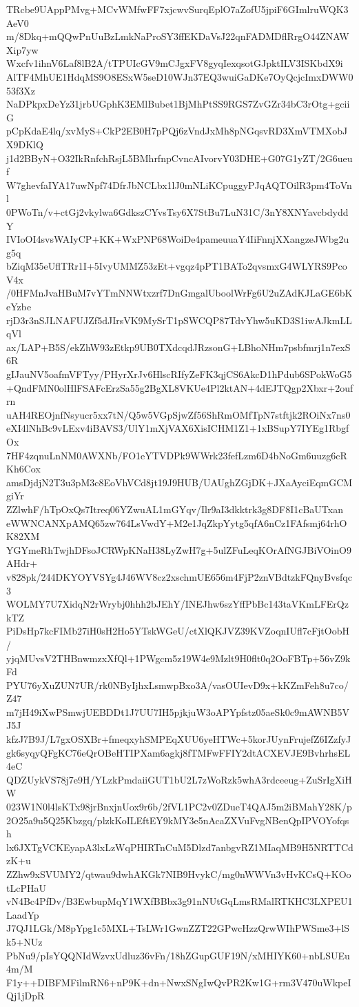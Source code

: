 TRcbe9UAppPMvg+MCvWMfwFF7xjcwvSurqEplO7aZofU5jpiF6GImlruWQK3AeV0
m/8Dkq+mQQwPnUuBzLmkNaProSY3ffEKDaVsJ22qnFADMDflRrgO44ZNAWXip7yw
Wxcfv1ihnV6Laf8lB2A/tTPUIcGV9mCJgxFV8gyqIexqsotGJpktILV3ISKbdX9i
AlTF4MhUE1HdqMS9O8ESxW5seD10WJn37EQ3wuiGaDKe7OyQcjcImxDWW053f3Xz
NaDPkpxDeYz31jrbUGphK3EMlBubet1BjMhPtSS9RGS7ZvGZr34bC3rOtg+gciiG
pCpKdaE4lq/xvMyS+CkP2EB0H7pPQj6zVndJxMh8pNGqsvRD3XmVTMXobJX9DKlQ
j1d2BByN+O32IkRnfchRsjL5BMhrfnpCvncAIvorvY03DHE+G07G1yZT/2G6ueuf
W7ghevfaIYA17uwNpf74DfrJbNCLbx1lJ0mNLiKCpuggyPJqAQTOilR3pm4ToVnl
0PWoTn/v+ctGj2vkylwa6GdkszCYvsTsy6X7StBu7LuN31C/3nY8XNYavcbdyddY
IVIoOI4svsWAIyCP+KK+WxPNP68WoiDe4pameuuaY4IiFnnjXXangzeJWbg2ug5q
bZiqM35eUflTRr1I+5IvyUMMZ53zEt+vgqz4pPT1BATo2qvsmxG4WLYRS9PcoV4x
/0HFMnJvaHBuM7vYTmNNWtxzrf7DnGmgalUboolWrFg6U2uZAdKJLaGE6bKeYzbe
rjD3r3nSJLNAFUJZf5dJIrsVK9MySrT1pSWCQP87TdvYhw5uKD3S1iwAJkmLLqVl
ax/LAP+B5S/ekZhW93zEtkp9UB0TXdcqdJRzsonG+LBhoNHm7psbfmrj1n7exS6R
gIJauNV5oafmVFTyy/PHyrXrJv6HlscRIfyZeFK3qjCS6AkcD1hPdub6SPokWoG5
+QndFMN0olHlFSAFcErzSa55g2BgXL8VKUe4Pl2ktAN+4dEJTQgp2Xbxr+2oufrn
uAH4REOjnfNsyucr5xx7tN/Q5w5VGpSjwZf56ShRmOMfTpN7stftjk2ROiNx7ns0
eXI4lNhBc9vLExv4iBAVS3/UlY1mXjVAX6XisICHM1Z1+1xBSupY7IYEg1RbgfOx
7HF4zqnuLnNM0AWXNb/FO1eYTVDPk9WWrk23fefLzm6D4bNoGm6uuzg6cRKh6Cox
amsDjdjN2T3u3pM3c8EoVhVCd8jt19J9HUB/UAUghZGjDK+JXaAyciEqmGCMgiYr
ZZlwhF/hTpOxQs7Itreq06YZwuAL1mGYqv/Ilr9aI3dkktrk3g8DF8I1cBaUTxan
eWWNCANXpAMQ65zw764LsVwdY+M2e1JqZkpYytg5qfA6nCz1FAfsmj64rhOK82XM
YGYmeRhTwjhDFsoJCRWpKNaH38LyZwH7g+5ulZFuLeqKOrAfNGJBiVOinO9AHdr+
v828pk/244DKYOYVSYg4J46WV8cz2xschmUE656m4FjP2znVBdtzkFQnyBvsfqc3
WOLMY7U7XidqN2rWrybj0hhh2bJEhY/INEJhw6szYffPbBc143taVKmLFErQzkTZ
PiDsHp7kcFIMb27iH0sH2Ho5YTskWGeU/ctXlQKJVZ39KVZoqnIUfl7cFjtOobH/
yjqMUvsV2THBnwmzxXfQl+1PWgcm5z19W4e9Mzlt9H0flt0q2OoFBTp+56vZ9kFd
PYU76yXuZUN7UR/rk0NByIjhxLsmwpBxo3A/vasOUIevD9x+kKZmFeh8u7co/Z47
m7jH49iXwPSmwjUEBDDt1J7UU7IH5pjkjuW3oAPYpfstz05aeSk0c9mAWNB5VJ5J
kfzJ7B9J/L7gxOSXBr+fmeqxyhSMPEqXUU6yeHTWc+5korJUynFrujefZ6IZzfyJ
gk6syqyQFgKC76eQrOBeHTIPXam6agkj8fTMFwFFIY2dtACXEVJE9BvhrhsEL4eC
QDZUykVS78j7e9H/YLzkPmdaiiGUT1bU2L7zWoRzk5whA3rdceeug+ZuSrIgXiHW
023W1N0l4lsKTx98jrBnxjnUox9r6b/2fVL1PC2v0ZDueT4QAJ5m2iBMahY28K/p
2O25a9u5Q25Kbzgq/plzkKoILEftEY9kMY3e5nAcaZXVuFvgNBenQpIPVOYofqsh
lx6JXTgVCKEyapA3lxLzWqPHIRTnCuM5Dlzd7anbgvRZ1MIaqMB9H5NRTTCdzK+u
ZZhw9xSVUMY2/qtwau9dwhAKGk7NIB9HvykC/mg0nWWVn3vHvKCsQ+KOotLcPHaU
vN4Bc4PfDv/B3EwbupMqY1WXfBBbx3g91nNUtGqLmsRMalRTKHC3LXPEU1LaadYp
J7QJ1LGk/M8pYpg1c5MXL+TsLWr1GwnZZT22GPwcHzzQrwWIhPWSme3+lSk5+NUz
PbNu9/pIsYQQNIdWzvxUdluz36vFn/18hZGupGUF19N/xMHIYK60+nbLSUEu4m/M
F1y++DIBFMFilmRN6+nP9K+dn+NwxSNgIwQvPR2Kw1G+rm3V470uWkpeIQj1jDpR
